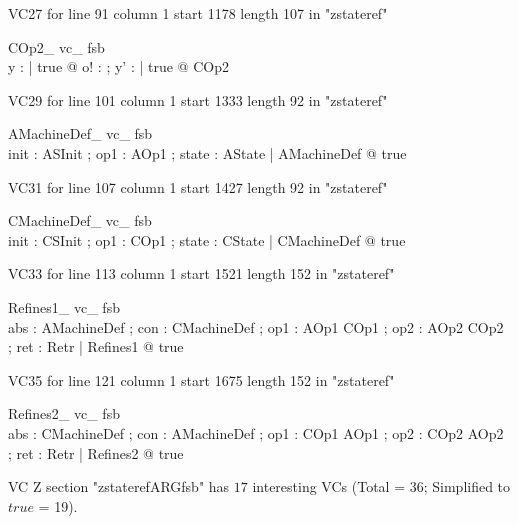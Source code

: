 \documentclass{article}
\begin{document}
VC27 for line 91 column 1 start 1178 length 107 in "zstateref"
\begin{theorem}{ COp2\_ vc\_ fsb}\\
 \forall y : \seq \nat | true @ \exists o! : \nat ; y' : \seq \nat | true @ COp2 \\

\end{theorem}

VC29 for line 101 column 1 start 1333 length 92 in "zstateref"
\begin{theorem}{ AMachineDef\_ vc\_ fsb}\\
 \exists init : ASInit ; op1 : AOp1 ; state : AState | AMachineDef @ true \\

\end{theorem}

VC31 for line 107 column 1 start 1427 length 92 in "zstateref"
\begin{theorem}{ CMachineDef\_ vc\_ fsb}\\
 \exists init : CSInit ; op1 : COp1 ; state : CState | CMachineDef @ true \\

\end{theorem}

VC33 for line 113 column 1 start 1521 length 152 in "zstateref"
\begin{theorem}{ Refines1\_ vc\_ fsb}\\
 \exists abs : AMachineDef ; con : CMachineDef ; op1 : AOp1 \cross COp1 ; op2 : AOp2 \cross COp2 ; ret : Retr | Refines1 @ true \\

\end{theorem}

VC35 for line 121 column 1 start 1675 length 152 in "zstateref"
\begin{theorem}{ Refines2\_ vc\_ fsb}\\
 \exists abs : CMachineDef ; con : AMachineDef ; op1 : COp1 \cross AOp1 ; op2 : COp2 \cross AOp2 ; ret : Retr | Refines2 @ true \\

\end{theorem}



 VC Z section "zstaterefARGfsb" has $17$ interesting VCs (Total = 36; Simplified to $true$ = 19).



\end{document}
